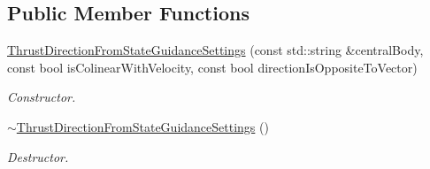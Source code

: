 \subsection*{Public Member Functions}
\begin{DoxyCompactItemize}
\item 
\hyperlink{classtudat_1_1simulation__setup_1_1ThrustDirectionFromStateGuidanceSettings_a1b2c8d43b9b9a16e3df9b07430a0edd1}{Thrust\+Direction\+From\+State\+Guidance\+Settings} (const std\+::string \&central\+Body, const bool is\+Colinear\+With\+Velocity, const bool direction\+Is\+Opposite\+To\+Vector)
\begin{DoxyCompactList}\small\item\em Constructor. \end{DoxyCompactList}\item 
\hyperlink{classtudat_1_1simulation__setup_1_1ThrustDirectionFromStateGuidanceSettings_a8f6a0eec5f3ad99d5b12c8585886abf8}{$\sim$\+Thrust\+Direction\+From\+State\+Guidance\+Settings} ()\hypertarget{classtudat_1_1simulation__setup_1_1ThrustDirectionFromStateGuidanceSettings_a8f6a0eec5f3ad99d5b12c8585886abf8}{}\label{classtudat_1_1simulation__setup_1_1ThrustDirectionFromStateGuidanceSettings_a8f6a0eec5f3ad99d5b12c8585886abf8}

\begin{DoxyCompactList}\small\item\em Destructor. \end{DoxyCompactList}\end{DoxyCompactItemize}
